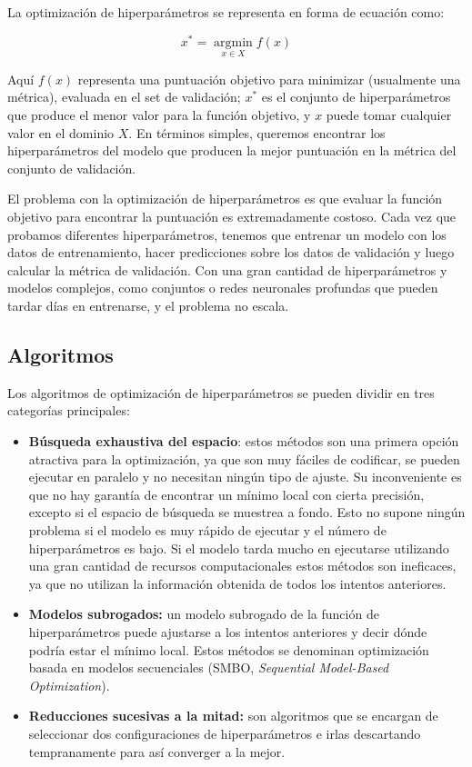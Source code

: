 \documentclass[a4paper,12pt]{article}
\begin{document}
La optimización de hiperparámetros se representa en forma de ecuación como:

$$x^* = \operatorname*{argmin}_{x \in X} f(x)$$

Aquí $f(x)$ representa una puntuación objetivo para minimizar (usualmente una métrica), evaluada en el set de validación; $x^*$ es el conjunto de hiperparámetros que produce el menor valor para la función objetivo, y $x$ puede tomar cualquier valor en el dominio $X$. En términos simples, queremos encontrar los hiperparámetros del modelo que producen la mejor puntuación en la métrica del conjunto de validación.

El problema con la optimización de hiperparámetros es que evaluar la función objetivo para encontrar la puntuación es extremadamente costoso. Cada vez que probamos diferentes hiperparámetros, tenemos que entrenar un modelo con los datos de entrenamiento, hacer predicciones sobre los datos de validación y luego calcular la métrica de validación. Con una gran cantidad de hiperparámetros y modelos complejos, como conjuntos o redes neuronales profundas que pueden tardar días en entrenarse, y el problema no escala.

\subsection{Algoritmos} \label{algo-hp}

Los algoritmos de optimización de hiperparámetros se pueden dividir en tres categorías principales:
\begin{itemize}[noitemsep, topsep=2pt]
	\item \textbf{Búsqueda exhaustiva del espacio}: estos métodos son una primera opción atractiva para la optimización, ya que son muy fáciles de codificar, se pueden ejecutar en paralelo y no necesitan ningún tipo de ajuste. Su inconveniente es que no hay garantía de encontrar un mínimo local con cierta precisión, excepto si el espacio de búsqueda se muestrea a fondo. Esto no supone ningún problema si el modelo es muy rápido de ejecutar y el número de hiperparámetros es bajo. Si el modelo tarda mucho en ejecutarse utilizando una gran cantidad de recursos computacionales estos métodos son ineficaces, ya que no utilizan la información obtenida de todos los intentos anteriores.
	\item \textbf{Modelos subrogados:} un modelo subrogado de la función de hiperparámetros puede ajustarse a los intentos anteriores y decir dónde podría estar el mínimo local. Estos métodos se denominan optimización basada en modelos secuenciales (SMBO, \textit{Sequential Model-Based Optimization}).
	\item \textbf{Reducciones sucesivas a la mitad:} son algoritmos que se encargan de seleccionar dos configuraciones de hiperparámetros e irlas descartando tempranamente para así converger a la mejor.
\end{itemize}
\end{document}
